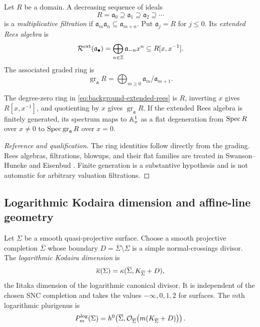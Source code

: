 \begin{definition}\label{def:extended-rees}
Let $R$ be a domain.  A decreasing sequence of ideals
\[
  R=\mathfrak a_0\supseteq\mathfrak a_1\supseteq\mathfrak a_2\supseteq\cdots
\]
is a \emph{multiplicative filtration} if $\mathfrak a_m\mathfrak a_n\subseteq\mathfrak a_{m+n}$.  Put $\mathfrak a_j=R$ for $j\leq0$.  Its \emph{extended Rees algebra} is
\begin{equation}\label{eq:background-extended-rees}
  \mathcal R^{\mathrm{ext}}(\mathfrak a_\bullet)
  =\bigoplus_{n\in\mathbb Z}\mathfrak a_{-n}x^n
  \subseteq R[x,x^{-1}].
\end{equation}
The associated graded ring is
\[
  \operatorname{gr}_{\mathfrak a}R
  =\bigoplus_{m\geq0}\mathfrak a_m/\mathfrak a_{m+1}.
\]
\end{definition}

\begin{recalledproposition}\label{prop:rees-family-background}
The degree-zero ring in \eqref{eq:background-extended-rees} is $R$, inverting $x$ gives $R[x,x^{-1}]$, and quotienting by $x$ gives $\operatorname{gr}_{\mathfrak a}R$.  If the extended Rees algebra is finitely generated, its spectrum maps to $\mathbb A^1_x$ as a flat degeneration from $\operatorname{Spec} R$ over $x\neq0$ to $\operatorname{Spec}\operatorname{gr}_{\mathfrak a}R$ over $x=0$.
\end{recalledproposition}

\begin{proof}[Reference and qualification]
The ring identities follow directly from the grading.  Rees algebras, filtrations, blowups, and their flat families are treated in Swanson--Huneke \cite[Chapter 5]{SwansonHuneke2006} and Eisenbud \cite[Chapters 5 and 6]{Eisenbud1995}.  Finite generation is a substantive hypothesis and is not automatic for arbitrary valuation filtrations.
\end{proof}

\subsection{Logarithmic Kodaira dimension and affine-line geometry}

\begin{definition}\label{def:log-kodaira}
Let $\Sigma$ be a smooth quasi-projective surface.  Choose a smooth projective completion $\overline\Sigma$ whose boundary $D=\overline\Sigma\setminus\Sigma$ is a simple normal-crossings divisor.  The \emph{logarithmic Kodaira dimension} is
\[
  \overline\kappa(\Sigma)=\kappa(\overline\Sigma,K_{\overline\Sigma}+D),
\]
the Iitaka dimension of the logarithmic canonical divisor.  It is independent of the chosen SNC completion and takes the values $-\infty,0,1,2$ for surfaces.  The $m$th logarithmic plurigenus is
\[
  P_m^{\log}(\Sigma)=h^0\!\left(\overline\Sigma,
  \mathcal O_{\overline\Sigma}\bigl(m(K_{\overline\Sigma}+D)\bigr)\right).
\]
\end{definition}

